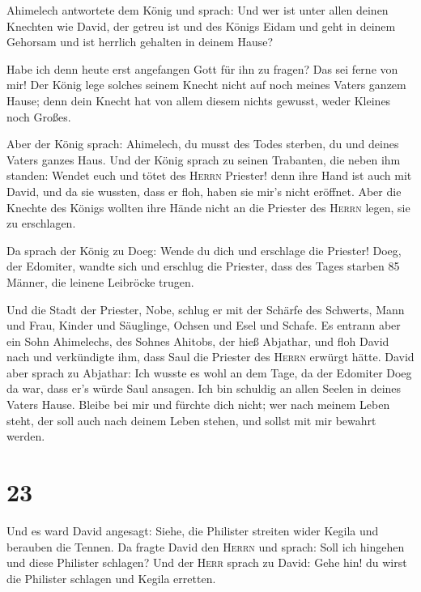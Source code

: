  Ahimelech antwortete dem König und sprach: Und wer ist
unter allen deinen Knechten wie David, der getreu ist und des Königs
Eidam und geht in deinem Gehorsam und ist herrlich gehalten in deinem
Hause?

 Habe ich denn heute erst angefangen Gott für ihn zu
fragen? Das sei ferne von mir! Der König lege solches seinem Knecht
nicht auf noch meines Vaters ganzem Hause; denn dein Knecht hat von
allem diesem nichts gewusst, weder Kleines noch Großes.

 Aber der König sprach: Ahimelech, du musst des Todes
sterben, du und deines Vaters ganzes Haus.  Und der König
sprach zu seinen Trabanten, die neben ihm standen: Wendet euch und tötet
des \textsc{Herrn} Priester! denn ihre Hand ist auch mit David, und da
sie wussten, dass er floh, haben sie mir's nicht eröffnet. Aber die
Knechte des Königs wollten ihre Hände nicht an die Priester des
\textsc{Herrn} legen, sie zu erschlagen.

 Da sprach der König zu Doeg: Wende du dich und erschlage
die Priester! Doeg, der Edomiter, wandte sich und erschlug die Priester,
dass des Tages starben 85 Männer, die leinene Leibröcke trugen.

 Und die Stadt der Priester, Nobe, schlug er mit der
Schärfe des Schwerts, Mann und Frau, Kinder und Säuglinge, Ochsen und
Esel und Schafe.  Es entrann aber ein Sohn Ahimelechs,
des Sohnes Ahitobs, der hieß Abjathar, und floh David nach
 und verkündigte ihm, dass Saul die Priester des
\textsc{Herrn} erwürgt hätte.  David aber sprach zu
Abjathar: Ich wusste es wohl an dem Tage, da der Edomiter Doeg da war,
dass er's würde Saul ansagen. Ich bin schuldig an allen Seelen in deines
Vaters Hause.  Bleibe bei mir und fürchte dich nicht; wer
nach meinem Leben steht, der soll auch nach deinem Leben stehen, und
sollst mit mir bewahrt werden.

\hypertarget{section-22}{%
\section{23}\label{section-22}}

 Und es ward David angesagt: Siehe, die Philister streiten
wider Kegila und berauben die Tennen.  Da fragte David den
\textsc{Herrn} und sprach: Soll ich hingehen und diese Philister
schlagen? Und der \textsc{Herr} sprach zu David: Gehe hin! du wirst die
Philister schlagen und Kegila erretten.

